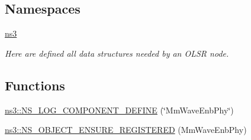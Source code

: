 \subsection*{Namespaces}
\begin{DoxyCompactItemize}
\item 
 \hyperlink{namespacens3}{ns3}
\begin{DoxyCompactList}\small\item\em Here are defined all data structures needed by an O\+L\+SR node. \end{DoxyCompactList}\end{DoxyCompactItemize}
\subsection*{Functions}
\begin{DoxyCompactItemize}
\item 
\hyperlink{namespacens3_a4e4e172d6c03aa8fc62d658d851cc938}{ns3\+::\+N\+S\+\_\+\+L\+O\+G\+\_\+\+C\+O\+M\+P\+O\+N\+E\+N\+T\+\_\+\+D\+E\+F\+I\+NE} (\char`\"{}Mm\+Wave\+Enb\+Phy\char`\"{})
\item 
\hyperlink{namespacens3_ac9ab99f47256f44b3a347301848a5ba4}{ns3\+::\+N\+S\+\_\+\+O\+B\+J\+E\+C\+T\+\_\+\+E\+N\+S\+U\+R\+E\+\_\+\+R\+E\+G\+I\+S\+T\+E\+R\+ED} (Mm\+Wave\+Enb\+Phy)
\end{DoxyCompactItemize}
